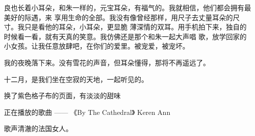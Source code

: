 \documentclass[12pt,a4paper]{article}
\begin{document}
		良也长着小耳朵，和朱一样的，元宝耳朵，有福气的。我就相信，他们都会拥有最美好的际遇，来
	享用生命的全部。我没有像曾经那样，用尺子去丈量耳朵的尺寸。我只是看他的耳朵，小耳朵，更显脆
	薄深情的双耳。用手机拍下来，独自的时候看一看，就有天真的笑意。我仿佛还是那个和朱一起大声唱
	歌，放学回家的小女孩。让我任意放肆吧，在你们的爱里。被宠爱，被宠坏。


		我的夜晚落下来。没有雪花的声音，但耳朵懂得，那将不再遥远了。

		十二月，是我们坐在空寂的天地，一起听见的。


		换了紫色格子布的页面，有淡淡的甜味

		正在播放的歌曲 —— 《By The Cathedral》 Keren Ann

		歌声清澈的法国女人。

\end{document}
